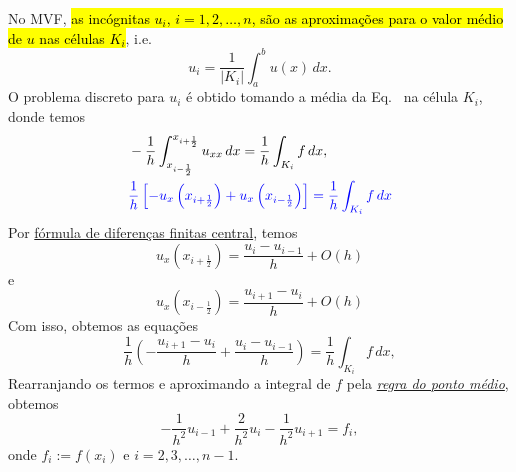 \begin{flushleft}
\end{flushleft}

No MVF, \hl{as incógnitas $u_i$, $i = 1, 2, \dotsc, n$, são as aproximações para o valor médio de $u$ nas células $K_i$}, i.e.
\begin{equation}
  u_i = \frac{1}{|K_i|}\int_{a}^{b}u(x)\,dx.
\end{equation}
O problema discreto para $u_i$ é obtido tomando a média da Eq.~\label{cap_pvc_sec_fem:eq:pvc_eq} na célula $K_i$, donde temos
\begin{subequations}
  \begin{align}
    &-\frac{1}{h}\int_{x_{i-\frac{1}{2}}}^{x_{i+\frac{1}{2}}}u_{xx}\,dx = \frac{1}{h}\int_{K_i}f\,dx,\\
    &\color{blue}\frac{1}{h}\left[-u_x\left(x_{i+\frac{1}{2}}\right) + u_x\left(x_{i-\frac{1}{2}}\right)\right] = \frac{1}{h}\int_{K_i}f\,dx\label{cap_pvc_sec_mvf:eq:aux00}
  \end{align}
\end{subequations}
Por \href{https://notaspedrok.com.br/notas/MatematicaNumericaII/cap_deriv_sec_df.html}{fórmula de diferenças finitas central}, temos
\begin{equation}
  u_{x}\left(x_{i+\frac{1}{2}}\right) = \frac{u_i - u_{i-1}}{h} + O(h)
\end{equation}
e
\begin{equation}
  u_x\left(x_{i-\frac{1}{2}}\right) = \frac{u_{i+1} - u_i}{h} + O(h)
\end{equation}
Com isso, obtemos as equações
\begin{equation}\label{cap_pvc_sec_mvf:eq:aux0}
  \frac{1}{h}\left(-\frac{u_{i+1}-u_{i}}{h} + \frac{u_i - u_{i-1}}{h}\right) = \frac{1}{h}\int_{K_i}f\,dx,
\end{equation}
Rearranjando os termos e aproximando a integral de $f$ pela \href{https://notaspedrok.com.br/notas/MatematicaNumericaII/cap_integr_sec_nc.html}{\emph{regra do ponto médio}}, obtemos
\begin{equation}\label{cap_pvc_sec_mvf:eq:aux}
  -\frac{1}{h^2}u_{i-1} + \frac{2}{h^2}u_i - \frac{1}{h^2}u_{i+1} = f_i,
\end{equation}
onde $f_i := f(x_i)$ e $i = 2, 3, \dotsc, n-1$.

